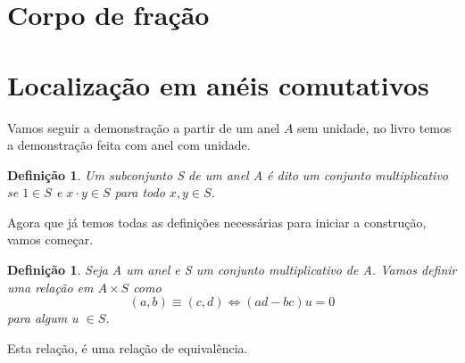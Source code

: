 \documentclass[10pt,a4paper]{article}
\newtheorem{definition}[theorem]{Definição}
\begin{document}




\section{Corpo de fração}

\section{Localização em anéis comutativos}

Vamos seguir a demonstração a partir de um anel $A$ sem unidade, no livro temos a demonstração feita com anel com unidade.

\begin{definition}
	Um subconjunto S de um anel A é dito um conjunto multiplicativo se $1 \in S$ e $ x\cdot y \in S$ para todo $x , y \in S$.
\end{definition}

Agora que já temos todas as definições necessárias para iniciar a construção, vamos começar.

\begin{definition}
	Seja A um anel e S um conjunto multiplicativo de A. Vamos definir uma relação em $A \times S$ como $$(a,b) \equiv (c, d) \Leftrightarrow (ad-bc)u=0$$ para algum u $\in S$.
\end{definition}

Esta relação, é uma relação de equivalência.
\end{document}
